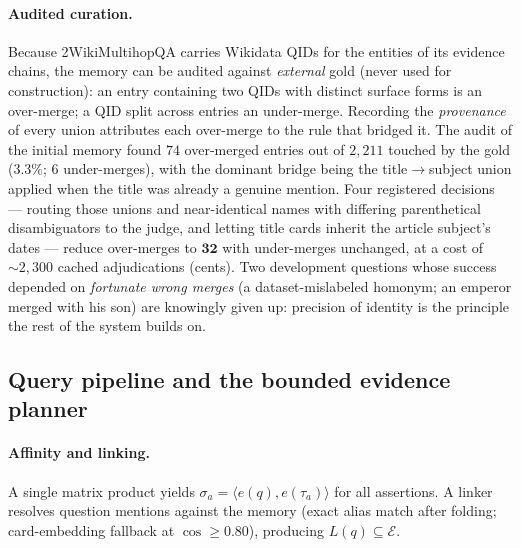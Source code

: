 \documentclass[11pt,a4paper]{article}
\begin{document}
\paragraph{Audited curation.} Because 2WikiMultihopQA carries Wikidata QIDs
for the entities of its evidence chains, the memory can be audited against
\emph{external} gold (never used for construction): an entry containing two
QIDs with distinct surface forms is an over-merge; a QID split across
entries an under-merge. Recording the \emph{provenance} of every union
attributes each over-merge to the rule that bridged it. The audit of the
initial memory found $74$ over-merged entries out of $2{,}211$ touched by
the gold ($3.3\%$; $6$ under-merges), with the dominant bridge being the
title$\to$subject union applied when the title was already a genuine
mention. Four registered decisions --- routing those unions and
near-identical names with differing parenthetical disambiguators to the
judge, and letting title cards inherit the article subject's dates ---
reduce over-merges to $\mathbf{32}$ with under-merges unchanged, at a cost
of ${\sim}2{,}300$ cached adjudications (cents). Two development questions
whose success depended on \emph{fortunate wrong merges} (a dataset-mislabeled
homonym; an emperor merged with his son) are knowingly given up: precision
of identity is the principle the rest of the system builds on.

\subsection{Query pipeline and the bounded evidence planner}
\label{sec:planner}

\paragraph{Affinity and linking.} A single matrix product yields
$\sigma_a=\langle e(q),e(\tau_a)\rangle$ for all assertions. A linker
resolves question mentions against the memory (exact alias match after
folding; card-embedding fallback at $\cos\ge0.80$), producing
$L(q)\subseteq\mathcal E$.
\end{document}
